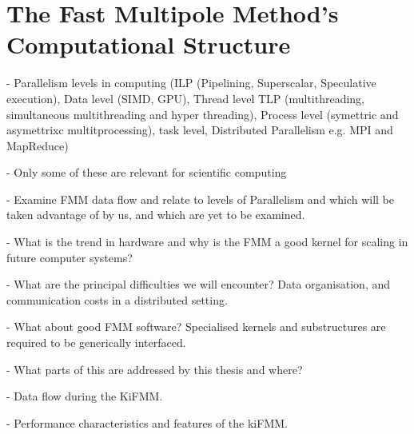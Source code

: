 \section{The Fast Multipole Method's Computational Structure}\label{chpt:fmm:sec:computational_structure}

- Parallelism levels in computing (ILP (Pipelining, Superscalar, Speculative execution), Data level (SIMD, GPU), Thread level TLP (multithreading, simultaneous multithreading and hyper threading), Process level (symettric and asymettrixc multitprocessing), task level, Distributed Parallelism e.g. MPI and MapReduce)

- Only some of these are relevant for scientific computing

- Examine FMM data flow and relate to levels of Parallelism and which will be taken advantage of by us, and which are yet to be examined.

- What is the trend in hardware and why is the FMM a good kernel for scaling in future computer systems?

- What are the principal difficulties we will encounter? Data organisation, and communication costs in a distributed setting.

- What about good FMM software? Specialised kernels and substructures are required to be generically interfaced.

- What parts of this are addressed by this thesis and where?

- Data flow during the KiFMM.

- Performance characteristics and features of the kiFMM.
